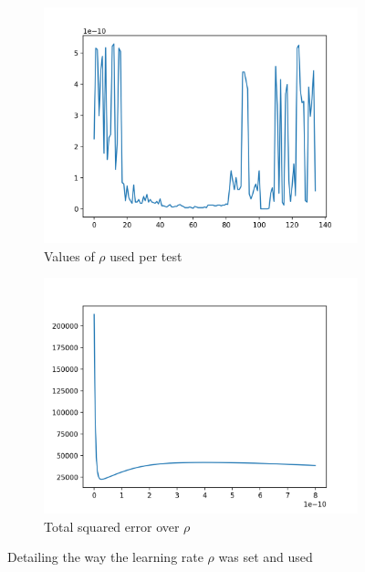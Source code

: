 \documentclass[12pt, a4paper]{article}
\begin{document}
\begin{figure}[H]
    \centering
    \begin{subfigure}{0.45\textwidth}
        \includegraphics[width=\textwidth]{recursos/2/lms_regression_individual_mu_values}
        \caption{ Values of $\rho$ used per test  }
    \end{subfigure}
    \begin{subfigure}{0.45\textwidth}
        \includegraphics[width=\textwidth]{recursos/2/lms_regression_global_mu_tune}
        \caption{ Total squared error over $\rho$ }
    \end{subfigure}
     \caption{ Detailing the way the learning rate $\rho$ was set and used }
\end{figure}
\end{document}
